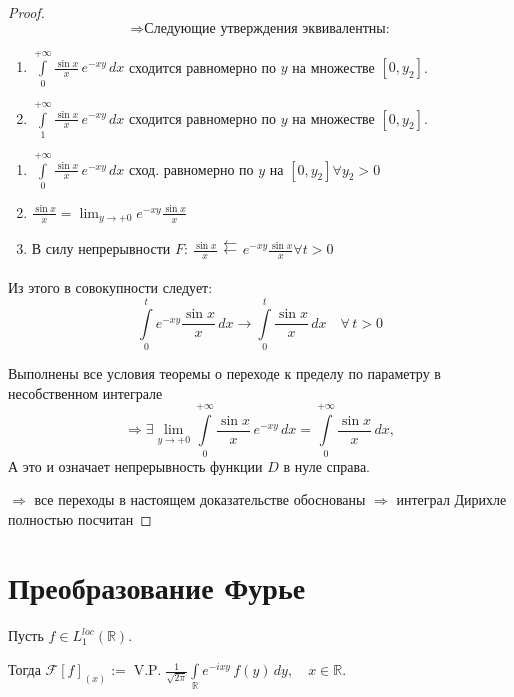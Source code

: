 \begin{proof}
\[
\Rightarrow \text{Следующие утверждения эквивалентны:}
\]

\begin{enumerate}
    \item \(\int\limits_0^{+\infty} \frac{\sin x}{x} \, e^{-x y} \, dx \) сходится равномерно по \( y \) на множестве \( [0, y_2] \).
    
    \item \(\int\limits_1^{+\infty} \frac{\sin x}{x} \, e^{-x y} \, dx \) сходится равномерно по \( y \) на множестве \( [0, y_2] \).
\end{enumerate}

\setlength{\parskip}{10pt}


\begin{enumerate}
    \item $\int\limits_0^{+\infty} \frac{\sin x}{x} \, e^{-x y} \, dx$ сход. равномерно по $y$ на $[0, y_2 ] \forall y_2>0$

    \item $\frac{\sin x}{x} = \lim_{y \to +0} e^{-x y} \frac{\sin x}{x}$


    \item В силу непрерывности $F$: $\frac{\sin x}{x} \mathrel{\substack{\leftleftarrows \\ [0, t]}} e^{-x y} \frac{\sin x}{x} \forall t >0$
    
\end{enumerate}

Из этого в совокупности следует:
\[
\int\limits_0^{t} e^{-x y} \frac{\sin x}{x} \, dx 
\longrightarrow 
\int\limits_0^{t} \frac{\sin x}{x} \, dx \quad \forall\, t > 0
\]


Выполнены все условия теоремы о переходе к пределу по параметру в несобственном интеграле %
\[
\Rightarrow \exists \lim_{y \to +0} \int\limits_0^{+\infty} \frac{\sin x}{x} \, e^{-x y} \, dx 
= \int\limits_0^{+\infty} \frac{\sin x}{x} \, dx,
\]
А это и означает непрерывность функции $D$ в нуле справа.


$\Rightarrow$ все переходы в настоящем доказательстве обоснованы $\Rightarrow$ интеграл Дирихле полностью посчитан

\end{proof}


\section{Преобразование Фурье}

\begin{definition}
Пусть $f \in L_1^{loc}(\mathbb{R}).$ 

\setlength{\parskip}{10pt}

Тогда $\mathcal{F}[f]_{(x)} := \operatorname{V.P.}\frac{1}{\sqrt{2\pi}} \int\limits_{\mathbb{R}} e^{-ixy} \, f(y) \, dy, \quad x \in \mathbb{R}.$
\end{definition}

